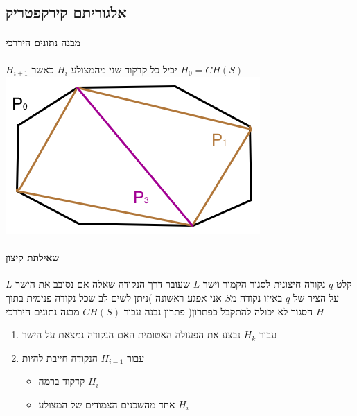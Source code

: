 \documentclass{article}
\makeatletter
\newcommand*{\saved@uline}{}
\let\saved@uline\uline
\newcommand*{\mathuline}{%
  \mathpalette{\math@uline\saved@uline}%
}
\newcommand*{\math@uline}[3]{%
  \mbox{#1{$#2#3\m@th$}}%
}
\renewcommand*{\uline}{%
  \relax  
  \ifmmode
    \expandafter\mathuline
  \else
    \expandafter\saved@uline
  \fi
}
\makeatother
\begin{document}
\subsection{אלגוריתם קירקפטריק}

\paragraph{מבנה נתונים היררכי}
$H_{i+1}$ יכיל כל קדקוד שני מהמצולע $H_i$ כאשר $H_0=CH(S)$ 
\includegraphics[scale=0.4]{z5.png}
\\

\paragraph{שאילתת קיצון}
\noindent\uline{קלט} $q$ נקודה חיצונית לסגור הקמור וישר $L$ שעובר דרך הנקודה  
\newline\uline{שאלה} אם נסובב את הישר $L$ על הציר של $q$ באיזו נקודה מ$S$ אני אפגע ראשונה )ניתן לשים לב שכל נקודה פנימית בתוך הסגור לא יכולה להתקבל כפתרון(
\newline\uline{פתרון} נבנה עבור $CH(S)$ מבנה נתונים היררכי $H$ 
\begin{enumerate}
\item עבור $H_k$ נבצע את הפעולה האטומית האם הנקודה נמצאת על הישר
\item עבור $H_{i-1}$ הנקודה חייבת להיות 
\begin{itemize}
\item קדקוד ברמה $H_i$
\item אחד מהשכנים הצמודים של המצולע $H_i$
\end{itemize}
\end{enumerate}
\end{document}
